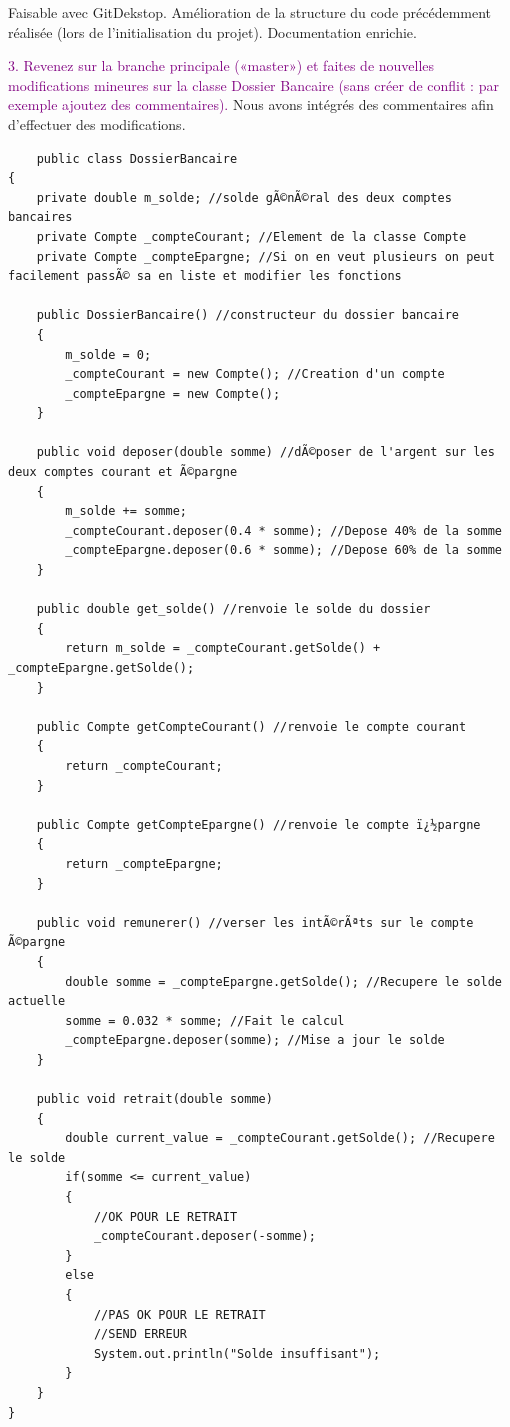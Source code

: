 \documentclass{article}
\begin{document}
Faisable avec GitDekstop. Amélioration de la structure du code précédemment réalisée (lors de l'initialisation du projet). Documentation enrichie.

\bigskip

\textcolor{Purple}{3. Revenez sur la branche principale («master») et faites de nouvelles modifications mineures sur la classe Dossier Bancaire (sans créer de conflit : par exemple ajoutez des
commentaires).}
\newline 
Nous avons intégrés des commentaires afin d'effectuer des modifications.
\begin{lstlisting}
    public class DossierBancaire
{	
	private double m_solde; //solde gÃ©nÃ©ral des deux comptes bancaires
	private Compte _compteCourant; //Element de la classe Compte
	private Compte _compteEpargne; //Si on en veut plusieurs on peut facilement passÃ© sa en liste et modifier les fonctions
	
    public DossierBancaire() //constructeur du dossier bancaire
    {
    	m_solde = 0;
    	_compteCourant = new Compte(); //Creation d'un compte
    	_compteEpargne = new Compte();
    }

    public void deposer(double somme) //dÃ©poser de l'argent sur les deux comptes courant et Ã©pargne
    {
    	m_solde += somme;
    	_compteCourant.deposer(0.4 * somme); //Depose 40% de la somme
    	_compteEpargne.deposer(0.6 * somme); //Depose 60% de la somme
    }
    
    public double get_solde() //renvoie le solde du dossier
    {
    	return m_solde = _compteCourant.getSolde() + _compteEpargne.getSolde();
    }
    
    public Compte getCompteCourant() //renvoie le compte courant
    {
    	return _compteCourant;
    }
    
    public Compte getCompteEpargne() //renvoie le compte ï¿½pargne
    {
    	return _compteEpargne;
    }
    
    public void remunerer() //verser les intÃ©rÃªts sur le compte Ã©pargne
    {
    	double somme = _compteEpargne.getSolde(); //Recupere le solde actuelle
    	somme = 0.032 * somme; //Fait le calcul
    	_compteEpargne.deposer(somme); //Mise a jour le solde
    }
    
    public void retrait(double somme)
    {
    	double current_value = _compteCourant.getSolde(); //Recupere le solde
    	if(somme <= current_value)
    	{
    		//OK POUR LE RETRAIT
    		_compteCourant.deposer(-somme);    		
    	}
    	else
    	{
    		//PAS OK POUR LE RETRAIT
    		//SEND ERREUR
    		System.out.println("Solde insuffisant");
    	}
    }
}
\end{lstlisting}
\end{document}
